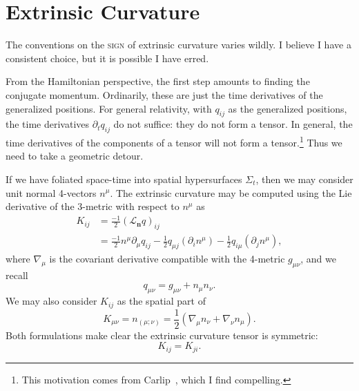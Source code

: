 \section{Extrinsic Curvature}

\begin{ddanger}
The conventions on the \textsc{sign} of extrinsic curvature varies wildly. I
believe I have a consistent choice, but it is possible I have erred.
\end{ddanger}

From the Hamiltonian perspective, the first step amounts to finding the
conjugate momentum. Ordinarily, these are just the time derivatives of
the generalized positions. For general relativity, with $q_{ij}$ as the
generalized positions, the time derivatives $\partial_{t}q_{ij}$ do not
suffice: they do not form a tensor. In general, the time derivatives of
the components of a tensor will not form a tensor.\footnote{This
motivation comes from Carlip~\cite{carlip2019}, which I find
compelling.} Thus we need to take a geometric detour.

If we have foliated space-time into spatial hypersurfaces $\Sigma_{t}$,
then we may consider unit normal 4-vectors $n^{\mu}$. The extrinsic
curvature may be computed using the Lie derivative of the 3-metric with
respect to $n^{\mu}$ as
\begin{equation}\label{eq:extrinsic-curvature:as-time-derivative-of-metric}
  \begin{split}
  K_{ij} &= \frac{-1}{2}(\mathcal{L}_{\mathbf{n}}q)_{ij}\\
  &= \frac{-1}{2}n^{\mu}\partial_{\mu}q_{ij} - \frac{1}{2} q_{\mu j}(\partial_{i}n^{\mu}) - \frac{1}{2} q_{i\mu}(\partial_{j}n^{\mu}),
  \end{split}
\end{equation}
where $\nabla_{\mu}$ is the covariant derivative compatible with the
4-metric $g_{\mu\nu}$, and we recall
\begin{equation}
q_{\mu\nu} = g_{\mu\nu} + n_{\mu}n_{\nu}.
\end{equation}
We may also consider $K_{ij}$ as the spatial  part of
\begin{equation}
K_{\mu\nu} = n_{(\mu;\nu)} = \frac{1}{2}(\nabla_{\mu}n_{\nu} + \nabla_{\nu}n_{\mu}).
\end{equation}
Both formulations make clear the extrinsic curvature tensor is
symmetric:
\begin{equation}
K_{ij} = K_{ji}.
\end{equation}

